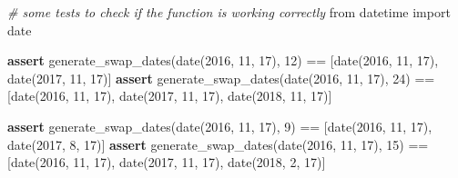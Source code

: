 \documentclass[11pt]{article}
\newenvironment{Shaded}{}{}
\newcommand{\DecValTok}[1]{\textcolor[rgb]{0.25,0.63,0.44}{{#1}}}
\newcommand{\CommentTok}[1]{\textcolor[rgb]{0.38,0.63,0.69}{\textit{{#1}}}}
\newcommand{\NormalTok}[1]{{#1}}
\newcommand{\ImportTok}[1]{{#1}}
\newcommand{\ControlFlowTok}[1]{\textcolor[rgb]{0.00,0.44,0.13}{\textbf{{#1}}}}
\newcommand{\OperatorTok}[1]{\textcolor[rgb]{0.40,0.40,0.40}{{#1}}}
\begin{document}
\begin{Shaded}
\begin{Highlighting}[]
\CommentTok{# some tests to check if the function is working correctly}
\ImportTok{from}\NormalTok{ datetime }\ImportTok{import}\NormalTok{ date}

\ControlFlowTok{assert}\NormalTok{ generate_swap_dates(date(}\DecValTok{2016}\NormalTok{, }\DecValTok{11}\NormalTok{, }\DecValTok{17}\NormalTok{), }\DecValTok{12}\NormalTok{) }\OperatorTok{==}\NormalTok{ [date(}\DecValTok{2016}\NormalTok{, }\DecValTok{11}\NormalTok{, }\DecValTok{17}\NormalTok{), }
\NormalTok{                                                       date(}\DecValTok{2017}\NormalTok{, }\DecValTok{11}\NormalTok{, }\DecValTok{17}\NormalTok{)]}
\ControlFlowTok{assert}\NormalTok{ generate_swap_dates(date(}\DecValTok{2016}\NormalTok{, }\DecValTok{11}\NormalTok{, }\DecValTok{17}\NormalTok{), }\DecValTok{24}\NormalTok{) }\OperatorTok{==}\NormalTok{ [date(}\DecValTok{2016}\NormalTok{, }\DecValTok{11}\NormalTok{, }\DecValTok{17}\NormalTok{), }
\NormalTok{                                                       date(}\DecValTok{2017}\NormalTok{, }\DecValTok{11}\NormalTok{, }\DecValTok{17}\NormalTok{), }
\NormalTok{                                                       date(}\DecValTok{2018}\NormalTok{, }\DecValTok{11}\NormalTok{, }\DecValTok{17}\NormalTok{)]}

\ControlFlowTok{assert}\NormalTok{ generate_swap_dates(date(}\DecValTok{2016}\NormalTok{, }\DecValTok{11}\NormalTok{, }\DecValTok{17}\NormalTok{), }\DecValTok{9}\NormalTok{) }\OperatorTok{==}\NormalTok{ [date(}\DecValTok{2016}\NormalTok{, }\DecValTok{11}\NormalTok{, }\DecValTok{17}\NormalTok{), }
\NormalTok{                                                      date(}\DecValTok{2017}\NormalTok{, }\DecValTok{8}\NormalTok{, }\DecValTok{17}\NormalTok{)]}
\ControlFlowTok{assert}\NormalTok{ generate_swap_dates(date(}\DecValTok{2016}\NormalTok{, }\DecValTok{11}\NormalTok{, }\DecValTok{17}\NormalTok{), }\DecValTok{15}\NormalTok{) }\OperatorTok{==}\NormalTok{ [date(}\DecValTok{2016}\NormalTok{, }\DecValTok{11}\NormalTok{, }\DecValTok{17}\NormalTok{), }
\NormalTok{                                                       date(}\DecValTok{2017}\NormalTok{, }\DecValTok{11}\NormalTok{, }\DecValTok{17}\NormalTok{), }
\NormalTok{                                                       date(}\DecValTok{2018}\NormalTok{, }\DecValTok{2}\NormalTok{, }\DecValTok{17}\NormalTok{)]}
\end{Highlighting}
\end{Shaded}


    
    
    
    
\end{document}
